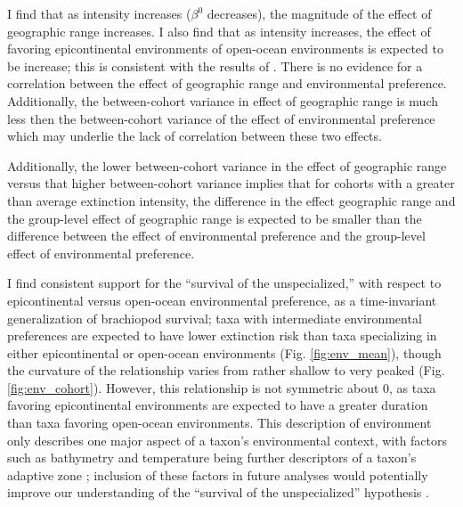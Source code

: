 \documentclass[11pt]{article}
\begin{document}
I find that as intensity increases (\(\beta^{0}\) decreases), the magnitude of the effect of geographic range increases. I also find that as intensity increases, the effect of favoring epicontinental environments of open-ocean environments is expected to be increase; this is consistent with the results of \citet{Miller2009a}. There is no evidence for a correlation between the effect of geographic range and environmental preference. Additionally, the between-cohort variance in effect of geographic range is much less then the between-cohort variance of the effect of environmental preference which may underlie the lack of correlation between these two effects.

Additionally, the lower between-cohort variance in the effect of geographic range versus that higher between-cohort variance implies that for cohorts with a greater than average extinction intensity, the difference in the effect geographic range and the group-level effect of geographic range is expected to be smaller than the difference between the effect of environmental preference and the group-level effect of environmental preference.

I find consistent support for the ``survival of the unspecialized,'' with respect to epicontinental versus open-ocean environmental preference, as a time-invariant generalization of brachiopod survival; taxa with intermediate environmental preferences are expected to have lower extinction risk than taxa specializing in either epicontinental or open-ocean environments (Fig. \ref{fig:env_mean}), though the curvature of the relationship varies from rather shallow to very peaked (Fig. \ref{fig:env_cohort}). However, this relationship is not symmetric about 0, as taxa favoring epicontinental environments are expected to have a greater duration than taxa favoring open-ocean environments. This description of environment only describes one major aspect of a taxon's environmental context, with factors such as bathymetry and temperature being further descriptors of a taxon's adaptive zone \citep{Nurnberg2013a,Harnik2013,Harnik2011,Heim2011}; inclusion of these factors in future analyses would potentially improve our understanding of the ``survival of the unspecialized'' hypothesis \citep{Simpson1944}.
\end{document}
